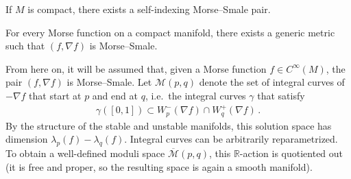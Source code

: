     \begin{property}
        If $M$ is compact, there exists a self-indexing Morse--Smale pair.
    \end{property}

    \begin{property}
        For every Morse function on a compact manifold, there exists a generic metric such that $(f,\nabla f)$ is Morse--Smale.
    \end{property}

    From here on, it will be assumed that, given a Morse function $f\in C^\infty(M)$, the pair $(f,\nabla f)$ is Morse--Smale. Let $\mathcal{M}(p,q)$ denote the set of integral curves of $-\nabla f$ that start at $p$ and end at $q$, i.e.~the integral curves $\gamma$ that satisfy
    \begin{gather}
        \gamma([0,1])\subset W^-_p(\nabla f)\cap W^+_q(\nabla f)\,.
    \end{gather}
    By the structure of the stable and unstable manifolds, this solution space has dimension $\lambda_p(f)-\lambda_q(f)$. Integral curves can be arbitrarily reparametrized. To obtain a well-defined moduli space $\overline{\mathcal{M}}(p,q)$, this $\mathbb{R}$-action is quotiented out (it is free and proper, so the resulting space is again a smooth manifold).


